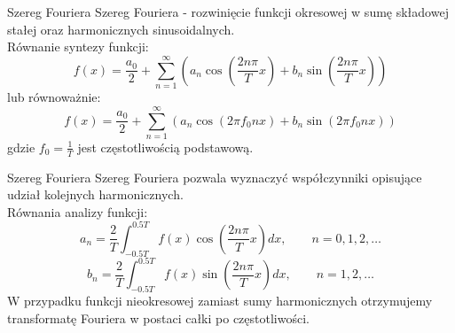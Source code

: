 
\begin{frame}{Szereg Fouriera}
	Szereg Fouriera - rozwinięcie funkcji okresowej w sumę składowej stałej oraz harmonicznych sinusoidalnych.\\
	Równanie syntezy funkcji:
	\begin{equation*}
		f(x) = \frac{a_0}{2} + \sum_{n=1}^{\infty} \left( a_n \cos \left( \frac{2n \pi}{T} x \right) + b_n \sin \left( \frac{2n \pi}{T} x \right) \right)
	\end{equation*}
	lub równoważnie:
	\begin{equation*}
		f(x) = \frac{a_0}{2} + \sum_{n=1}^{\infty} \left( a_n \cos \left( 2 \pi f_0 n x \right) + b_n \sin \left( 2 \pi f_0 n x \right) \right)
	\end{equation*}
	gdzie $f_0=\frac{1}{T}$ jest częstotliwością podstawową.
\end{frame}

\begin{frame}{Szereg Fouriera}
	Szereg Fouriera pozwala wyznaczyć współczynniki opisujące udział kolejnych harmonicznych.\\
	Równania analizy funkcji:
	\begin{equation*}
		a_n = \frac{2}{T} \int_{-0.5T}^{0.5T} f(x) \cos \left(\frac{2 n \pi}{T} x \right) dx, \qquad n=0,1,2,\dots
	\end{equation*}
	\begin{equation*}
		b_n = \frac{2}{T} \int_{-0.5T}^{0.5T} f(x) \sin \left(\frac{2 n \pi}{T} x \right) dx, \qquad n=1,2,\dots
	\end{equation*}
	W przypadku funkcji nieokresowej zamiast sumy harmonicznych otrzymujemy transformatę Fouriera w postaci całki po częstotliwości.
\end{frame}

